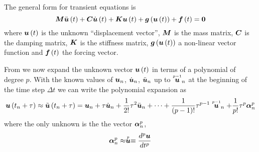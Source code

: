 The general form for transient equations is
\begin{equation}
  \matr{M}\fnof{\ddot{\vect{u}}}{t}+\matr{C}\fnof{\dot{\vect{u}}}{t}+\matr{K}\fnof{\vect{u}}{t}+
  \fnof{\vect{g}}{\fnof{\vect{u}}{t}}+\fnof{\vect{f}}{t}=\vect{0}
  \label{eqn:generaltransientnonlinear}
\end{equation}
where $\fnof{\vect{u}}{t}$ is the unknown ``displacement vector'', $\matr{M}$
is the mass matrix, $\matr{C}$ is the damping matrix, $\matr{K}$ is the
stiffness matrix, $\fnof{\vect{g}}{\fnof{\vect{u}}{t}}$ a non-linear vector
function and $\fnof{\vect{f}}{t}$ the forcing vector.

From \cite{zienkiewicz:2006_1} we now expand the unknown vector $\fnof{\vect{u}}{t}$ in terms of a polynomial of degree
$p$. With the known values of $\vect{u}_{n}$, $\dot{\vect{u}}_{n}$,
$\ddot{\vect{u}}_{n}$ up to $\symover{p-1}{\vect{u}}_{n}$ at the beginning of
the time step $\Delta t$ we can write the polynomial expansion as
\begin{equation}
  \fnof{\vect{u}}{t_{n}+\tau}\approx\fnof{\tilde{\vect{u}}}{t_{n}+\tau}=\vect{u}_{n}+\tau\dot{\vect{u}}_{n}+
  \frac{1}{2!}\tau^{2}\ddot{\vect{u}}_{n}+\cdots+\dfrac{1}{\factorial{p-1}}\tau^{p-1}\symover{p-1}{\vect{u}}_{n}+
  \dfrac{1}{p!}\tau^{p}\vect{\alpha}^{p}_{n}
  \label{eqn:timepolyexpansion}
\end{equation}
where the only unknown is the the vector $\vect{\alpha}^{p}_{n}$,
\begin{equation}
  \vect{\alpha}^{p}_{n}\approx\symover{p}{\vect{u}}\equiv\dnby{p}{\vect{u}}{t}
\end{equation}

